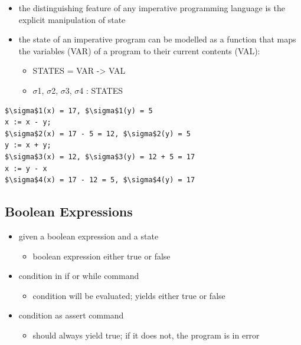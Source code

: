 \begin{itemize}
\tightlist
\item
  the distinguishing feature of any imperative programming language is
  the explicit manipulation of state
\item
  the state of an imperative program can be modelled as a function that
  maps the variables (VAR) of a program to their current contents (VAL):

  \begin{itemize}
  \tightlist
  \item
    STATES = VAR -\textgreater{} VAL
  \item
    $\sigma$1, $\sigma$2, $\sigma$3, $\sigma$4 : STATES
  \end{itemize}
\end{itemize}

\begin{lstlisting}
$\sigma$1(x) = 17, $\sigma$1(y) = 5
x := x - y;
$\sigma$2(x) = 17 - 5 = 12, $\sigma$2(y) = 5
y := x + y;
$\sigma$3(x) = 12, $\sigma$3(y) = 12 + 5 = 17
x := y - x
$\sigma$4(x) = 17 - 12 = 5, $\sigma$4(y) = 17
\end{lstlisting}

\hypertarget{boolean-expressions}{%
\subsection{Boolean Expressions}\label{boolean-expressions}}

\begin{itemize}
\tightlist
\item
  given a boolean expression and a state

  \begin{itemize}
  \tightlist
  \item
    boolean expression either true or false
  \end{itemize}
\item
  condition in if or while command

  \begin{itemize}
  \tightlist
  \item
    condition will be evaluated; yields either true or false
  \end{itemize}
\item
  condition as assert command

  \begin{itemize}
  \tightlist
  \item
    should always yield true; if it does not, the program is in error
  \end{itemize}
\end{itemize}

